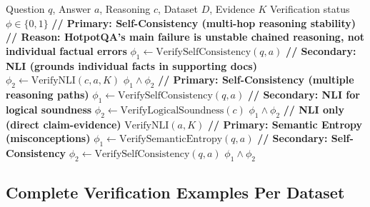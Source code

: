 \documentclass[12pt,a4paper]{article}
\theoremstyle{definition}
\begin{document}
\begin{algorithm}[htbp]
\caption{Dataset-Adaptive Multi-Layer Verification}
\begin{algorithmic}[1]
\Require Question $q$, Answer $a$, Reasoning $c$, Dataset $D$, Evidence $K$
\Ensure Verification status $\phi \in \{0, 1\}$
\State
{}
    \State \textbf{// Primary: Self-Consistency (multi-hop reasoning stability)}
    \State \textbf{// Reason: HotpotQA's main failure is unstable chained reasoning, not individual factual errors}
    \State $\phi_1 \gets \text{VerifySelfConsistency}(q, a)$
        \State {} 
    \EndIf
    \State \textbf{// Secondary: NLI (grounds individual facts in supporting docs)}
    \State $\phi_2 \gets \text{VerifyNLI}(c, a, K)$
    \State \Return $\phi_1 \land \phi_2$
    \State \textbf{// Primary: Self-Consistency (multiple reasoning paths)}
    \State $\phi_1 \gets \text{VerifySelfConsistency}(q, a)$
        \State {} 
    \EndIf
    \State \textbf{// Secondary: NLI for logical soundness}
    \State $\phi_2 \gets \text{VerifyLogicalSoundness}(c)$
    \State \Return $\phi_1 \land \phi_2$
    \State \textbf{// NLI only (direct claim-evidence)}
    \State \Return $\text{VerifyNLI}(a, K)$
    \State \textbf{// Primary: Semantic Entropy (misconceptions)}
    \State $\phi_1 \gets \text{VerifySemanticEntropy}(q, a)$
        \State {} 
    \EndIf
    \State \textbf{// Secondary: Self-Consistency}
    \State $\phi_2 \gets \text{VerifySelfConsistency}(q, a)$
    \State \Return $\phi_1 \land \phi_2$
\EndIf
\end{algorithmic}
\end{algorithm}

\subsection{Complete Verification Examples Per Dataset}
\end{document}
